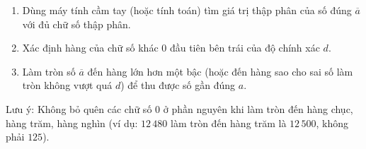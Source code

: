 \begin{enumerate}
\item Dùng máy tính cầm tay (hoặc tính toán) tìm giá trị thập phân của số đúng $\overline{a}$ với đủ chữ số thập phân.
\item Xác định hàng của chữ số khác $0$ đầu tiên bên trái của độ chính xác $d$.
\item Làm tròn số $\overline{a}$ đến hàng lớn hơn một bậc (hoặc đến hàng sao cho sai số làm tròn không vượt quá $d$) để thu được số gần đúng $a$.
\end{enumerate}
Lưu ý: Không bỏ quên các chữ số $0$ ở phần nguyên khi làm tròn đến hàng chục, hàng trăm, hàng nghìn (ví dụ: $12\,480$ làm tròn đến hàng trăm là $12\,500$, không phải $125$).
